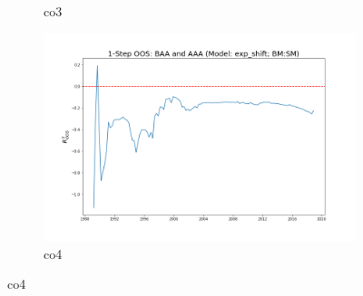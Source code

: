 \documentclass[a4paper,12pt,times,numbered,print,index]{report}
\numberwithin{equation}{section}
\begin{document}
\begin{figure}[!htbp]
\begin{subfigure}[b]{0.42\linewidth}
		\caption{co3}
	\end{subfigure}
	\begin{subfigure}[b]{0.42\linewidth}
		\includegraphics[width=0.9\linewidth]{OOS_plots/exp_shift_co4_SM.png}
		\caption{co4}
	\end{subfigure}
	\label{g5}
\end{figure}
\end{document}
